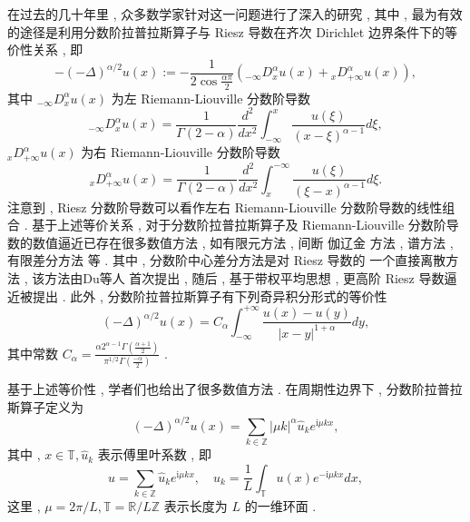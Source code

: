 在过去的几十年里 , 众多数学家针对这一问题进行了深入的研究 , 其中 , 最为有效的途径是利用分数阶拉普拉斯算子与 Riesz 导数在齐次 Dirichlet 边界条件下的等价性关系 \cite{yangNumericalMethodsFractional2010,demengelFunctionalSpacesTheory2012} , 即
\begin{equation}
-(-\Delta)^{\alpha / 2} u(x):=-\frac{1}{2 \cos \frac{\alpha \pi}{2}}\left({ }_{-\infty }D_x^\alpha u(x)+{ }_x D_{+\infty}^\alpha u(x)\right) , 
\end{equation}
其中 ${ }_{-\infty} D_x^\alpha u(x)$ 为左 Riemann-Liouville 分数阶导数
\begin{equation}
{ }_{-\infty} D_x^\alpha u(x)=\frac{1}{\Gamma(2-\alpha)} \frac{d^2}{d x^2} \int_{-\infty}^x \frac{u(\xi)}{(x-\xi)^{\alpha-1}} d \xi , 
\end{equation}
${ }_x D_{+\infty}^\alpha u(x)$ 为右 Riemann-Liouville 分数阶导数
\begin{equation}
{ }_x D_{+\infty}^\alpha u(x)=\frac{1}{\Gamma(2-\alpha)} \frac{d^2}{d x^2} \int^{-\infty}_x \frac{u(\xi)}{(\xi-x)^{\alpha-1}} d \xi  . 
\end{equation}
注意到 , Riesz 分数阶导数可以看作左右 Riemann-Liouville 分数阶导数的线性组合 . 
基于上述等价关系 , 对于分数阶拉普拉斯算子及 Riemann-Liouville 分数阶导数的数值逼近已存在很多数值方法 , 如有限元方法 \cite{dengFiniteElementMethod2009,ervinNumericalApproximationTime2007} , 间断 伽辽金 方法 \cite{xuDiscontinuousGalerkinMethod2014} , 谱方法 \cite{zayernouriFractionalSpectralCollocation2014,zengCrankNicolsonADI2014} , 有限差分方法 \cite{chenFourthOrderAccurate2014,meerschaertFiniteDifferenceApproximations2004} 等 . 
其中 , 分数阶中心差分方法是对 Riesz 导数的 一个直接离散方法 , 该方法由Du等人 \cite{duAnalysisApproximationNonlocal2012} 首次提出 , 随后 , 基于带权平均思想 , 更高阶 Riesz 导数逼近被提出 \cite{dingHighorderAlgorithmsRiesz2015,zhangFourthOrderCompactDifference2014} . 
此外 , 分数阶拉普拉斯算子有下列奇异积分形式的等价性 \cite{duAnalysisApproximationNonlocal2012}
\begin{equation}
(-\Delta)^{\alpha / 2} u(x)=C_\alpha \int_{-\infty}^{+\infty} \frac{u(x)-u(y)}{|x-y|^{1+\alpha}} d y , 
\end{equation}
其中常数 $C_\alpha=\frac{\alpha 2^{\alpha-1} \Gamma\left(\frac{\alpha+1}{2}\right)}{\pi^{1 / 2} \Gamma\left(\frac{-\alpha}{2}\right)}$ . 

基于上述等价性 , 学者们也给出了很多数值方法\cite{gaoMeanExitTime2014,huangNumericalMethodsFractional2014} . 在周期性边界下 , 分数阶拉普拉斯算子定义为 \cite{guoFractionalPartialDifferential2015}
\begin{equation}
(-\Delta)^{\alpha / 2} u(x)=\sum_{k \in \mathbb{Z}}|\mu k|^\alpha \hat{u}_k e^{\mathrm{i} \mu k x} , 
\end{equation}
其中 , $x \in \mathbb{T} , \hat{u}_k$ 表示傅里叶系数 , 即
\begin{equation}
u=\sum_{k \in \mathbb{Z}} \hat{u}_k e^{\mathrm{i} \mu k x} , \quad \hat{u}_k=\frac{1}{L} \int_{\mathbb{T}} u(x) e^{-\mathrm{i} \mu k x} d x , 
\end{equation}
这里 , $\mu=2 \pi / L , \mathbb{T}=\mathbb{R} / L \mathbb{Z}$ 表示长度为 $L$ 的一维环面 . 


